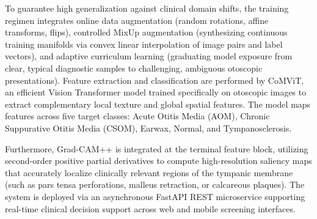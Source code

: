 \documentclass[12pt,a4paper]{report}
\renewcommand{\textbf}[1]{#1}
\begin{document}
To guarantee high generalization against clinical domain shifts, the training regimen integrates \textbf{online data augmentation} (random rotations, affine transforms, flips), \textbf{controlled MixUp augmentation} (synthesizing continuous training manifolds via convex linear interpolation of image pairs and label vectors), and \textbf{adaptive curriculum learning} (graduating model exposure from clear, typical diagnostic samples to challenging, ambiguous otoscopic presentations). Feature extraction and classification are performed by \textbf{CoMViT}, an efficient Vision Transformer model trained specifically on otoscopic images to extract complementary local texture and global spatial features. The model maps features across five target classes: \textbf{Acute Otitis Media (AOM)}, \textbf{Chronic Suppurative Otitis Media (CSOM)}, \textbf{Earwax}, \textbf{Normal}, and \textbf{Tympanosclerosis}.

Furthermore, \textbf{Grad-CAM++} is integrated at the terminal feature block, utilizing second-order positive partial derivatives to compute high-resolution saliency maps that accurately localize clinically relevant regions of the tympanic membrane (such as pars tensa perforations, malleus retraction, or calcareous plaques). The system is deployed via an asynchronous \textbf{FastAPI} REST microservice supporting real-time clinical decision support across web and mobile screening interfaces.
\end{document}
